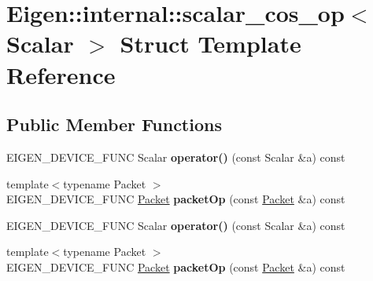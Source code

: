 \hypertarget{struct_eigen_1_1internal_1_1scalar__cos__op}{}\section{Eigen\+:\+:internal\+:\+:scalar\+\_\+cos\+\_\+op$<$ Scalar $>$ Struct Template Reference}
\label{struct_eigen_1_1internal_1_1scalar__cos__op}
\subsection*{Public Member Functions}
\begin{DoxyCompactItemize}
\item 
\mbox{\label{struct_eigen_1_1internal_1_1scalar__cos__op_ad1350db45d4f034c6b76d4e7e115ef6e}} 
E\+I\+G\+E\+N\+\_\+\+D\+E\+V\+I\+C\+E\+\_\+\+F\+U\+NC Scalar {\bfseries operator()} (const Scalar \&a) const
\item 
\mbox{\label{struct_eigen_1_1internal_1_1scalar__cos__op_ad4038c3e133d18c0132a8368837ca6ef}} 
{\footnotesize template$<$typename Packet $>$ }\\E\+I\+G\+E\+N\+\_\+\+D\+E\+V\+I\+C\+E\+\_\+\+F\+U\+NC \hyperlink{union_eigen_1_1internal_1_1_packet}{Packet} {\bfseries packet\+Op} (const \hyperlink{union_eigen_1_1internal_1_1_packet}{Packet} \&a) const
\item 
\mbox{\label{struct_eigen_1_1internal_1_1scalar__cos__op_ad1350db45d4f034c6b76d4e7e115ef6e}} 
E\+I\+G\+E\+N\+\_\+\+D\+E\+V\+I\+C\+E\+\_\+\+F\+U\+NC Scalar {\bfseries operator()} (const Scalar \&a) const
\item 
\mbox{\label{struct_eigen_1_1internal_1_1scalar__cos__op_ad4038c3e133d18c0132a8368837ca6ef}} 
{\footnotesize template$<$typename Packet $>$ }\\E\+I\+G\+E\+N\+\_\+\+D\+E\+V\+I\+C\+E\+\_\+\+F\+U\+NC \hyperlink{union_eigen_1_1internal_1_1_packet}{Packet} {\bfseries packet\+Op} (const \hyperlink{union_eigen_1_1internal_1_1_packet}{Packet} \&a) const
\end{DoxyCompactItemize}


